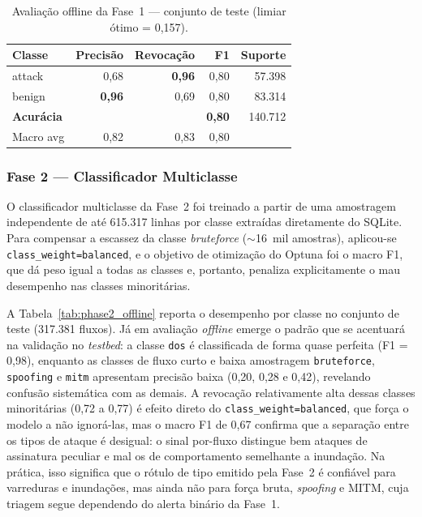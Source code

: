 \documentclass[12pt]{article}
\begin{document}
\begin{table}[ht]
\centering
\caption{Avaliação offline da Fase~1 — conjunto de teste (limiar ótimo = 0,157).}
\label{tab:phase1_offline}
\begin{tabular}{@{}lrrrr@{}}
\toprule
\textbf{Classe} & \textbf{Precisão} & \textbf{Revocação} & \textbf{F1} & \textbf{Suporte} \\ \midrule
attack  & 0,68 & \textbf{0,96} & 0,80 & 57.398 \\
benign  & \textbf{0,96} & 0,69 & 0,80 & 83.314 \\ \midrule
\textbf{Acurácia} & & & \textbf{0,80} & 140.712 \\
Macro avg & 0,82 & 0,83 & 0,80 & \\
\bottomrule
\end{tabular}
\end{table}

\subsubsection{Fase 2 — Classificador Multiclasse}

O classificador multiclasse da Fase~2 foi treinado a partir de uma
amostragem independente de até 615.317 linhas por classe extraídas diretamente do
SQLite. Para compensar a escassez da classe \textit{bruteforce}
($\sim$16~mil amostras), aplicou-se \texttt{class\_weight=balanced}, e o objetivo
de otimização do Optuna foi o macro F1, que dá peso igual a todas as classes e,
portanto, penaliza explicitamente o mau desempenho nas classes minoritárias.

A Tabela~\ref{tab:phase2_offline} reporta o desempenho por classe no conjunto de
teste (317.381 fluxos). Já em avaliação \textit{offline} emerge o padrão que se
acentuará na validação no \textit{testbed}: a classe \texttt{dos} é classificada de forma
quase perfeita (F1 = 0,98), enquanto as classes de fluxo curto e baixa amostragem
\texttt{bruteforce}, \texttt{spoofing} e \texttt{mitm} apresentam precisão baixa
(0,20, 0,28 e 0,42), revelando confusão sistemática com as demais. A revocação
relativamente alta dessas classes minoritárias (0,72 a 0,77) é efeito direto do
\texttt{class\_weight=balanced}, que força o modelo a não ignorá-las, mas o macro
F1 de 0,67 confirma que a separação entre os tipos de ataque é desigual: o sinal
por-fluxo distingue bem ataques de assinatura peculiar e mal os de comportamento
semelhante a inundação. Na prática, isso significa que o rótulo de tipo emitido
pela Fase~2 é confiável para varreduras e inundações, mas ainda não para força
bruta, \textit{spoofing} e MITM, cuja triagem segue dependendo do alerta binário
da Fase~1.
\end{document}
